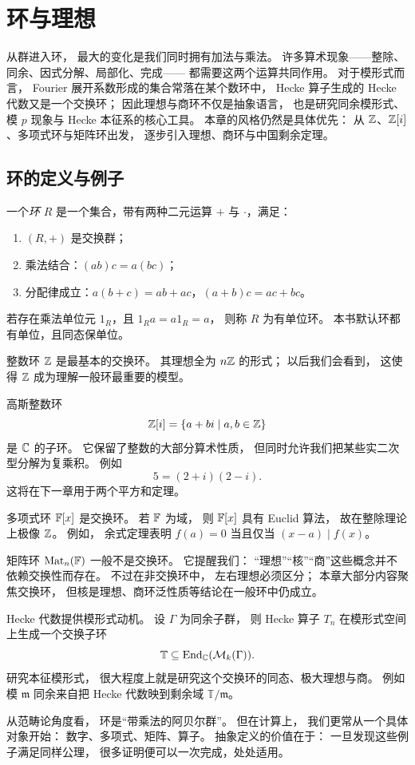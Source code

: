 \chapter{环与理想}
从群进入环， 最大的变化是我们同时拥有加法与乘法。 许多算术现象——整除、同余、因式分解、局部化、完成—— 都需要这两个运算共同作用。 对于模形式而言， Fourier 展开系数形成的集合常落在某个数环中， Hecke 算子生成的 Hecke 代数又是一个交换环； 因此理想与商环不仅是抽象语言， 也是研究同余模形式、模 $p$ 现象与 Hecke 本征系的核心工具。 本章的风格仍然是具体优先： 从 $\mathbb{Z}$、$\mathbb{Z}[i]$、多项式环与矩阵环出发， 逐步引入理想、商环与中国剩余定理。
\section{环的定义与例子}
\begin{definition}
一个\emph{环} $R$ 是一个集合，带有两种二元运算 $+$ 与 $\cdot$，满足：
\begin{enumerate}[label=(\arabic*)]
\item $(R,+)$ 是交换群；
\item 乘法结合：$(ab)c=a(bc)$；
\item 分配律成立：$a(b+c)=ab+ac$，$(a+b)c=ac+bc$。
\end{enumerate}
若存在乘法单位元 $1_R$，且 $1_Ra=a1_R=a$， 则称 $R$ 为有单位环。 本书默认环都有单位，且同态保单位。
\end{definition}
\begin{example}
整数环 $\mathbb{Z}$ 是最基本的交换环。 其理想全为 $n\mathbb{Z}$ 的形式； 以后我们会看到， 这使得 $\mathbb{Z}$ 成为理解一般环最重要的模型。
\end{example}
\begin{example}
高斯整数环
\[
\mathbb{Z}[i]=\{a+bi\mid a,b\in \mathbb{Z}\}
\]
是 $\mathbb{C}$ 的子环。 它保留了整数的大部分算术性质， 但同时允许我们把某些实二次型分解为复乘积。 例如
\[
5=(2+i)(2-i).
\]
这将在下一章用于两个平方和定理。
\end{example}
\begin{example}
多项式环 $\mathbb{F}[x]$ 是交换环。 若 $\mathbb{F}$ 为域， 则 $\mathbb{F}[x]$ 具有 Euclid 算法， 故在整除理论上极像 $\mathbb{Z}$。 例如， 余式定理表明 $f(a)=0$ 当且仅当 $(x-a)\mid f(x)$。
\end{example}
\begin{example}
矩阵环 $\mathrm{Mat}_n(\mathbb{F})$ 一般不是交换环。 它提醒我们： “理想”“核”“商”这些概念并不依赖交换性而存在。 不过在非交换环中， 左右理想必须区分； 本章大部分内容聚焦交换环， 但核是理想、商环泛性质等结论在一般环中仍成立。
\end{example}
\begin{example}
Hecke 代数提供模形式动机。 设 $\Gamma$ 为同余子群， 则 Hecke 算子 $T_n$ 在模形式空间上生成一个交换子环
\[
\mathbb{T}\subseteq \mathrm{End}_{\mathbb{C}}(\mathcal{M}_k(\Gamma)).
\]
研究本征模形式， 很大程度上就是研究这个交换环的同态、极大理想与商。 例如模 $\mathfrak m$ 同余来自把 Hecke 代数映到剩余域 $\mathbb{T}/\mathfrak m$。
\end{example}
\begin{remark}
从范畴论角度看， 环是“带乘法的阿贝尔群”。 但在计算上， 我们更常从一个具体对象开始： 数字、多项式、矩阵、算子。 抽象定义的价值在于： 一旦发现这些例子满足同样公理， 很多证明便可以一次完成，处处适用。
\end{remark}
